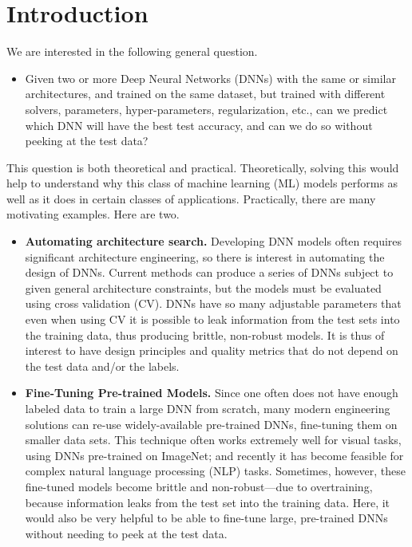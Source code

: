 
\section{Introduction}
\label{sxn:intro}

We are interested in the following general question.
\begin{itemize}
\item
Given two or more Deep Neural Networks (DNNs) with the same or similar architectures, and trained on the same dataset, but trained with different solvers, parameters, hyper-parameters, regularization, etc., can we predict which DNN will have the best test accuracy, and can we do so without peeking at the test data? 
\end{itemize}

This question is both theoretical and practical. 
Theoretically, solving this would help to understand why this class of machine learning (ML) models performs as well as it does in certain classes of applications.
Practically, there are many motivating examples.
% 
Here are two.
\begin{itemize}
\item
\textbf{Automating architecture search.}
Developing DNN models often requires significant architecture engineering, so there is interest in automating the design of DNNs.
Current methods can produce a series of DNNs subject to given general architecture constraints, but the models must be evaluated using cross validation (CV).
DNNs have so many adjustable parameters that even when using CV it is possible to leak information from the test sets into the training data, thus producing brittle, non-robust models.
It is thus of interest to have design principles and quality metrics that do not depend on the test data and/or the labels. 
\item
\textbf{Fine-Tuning Pre-trained Models.}
Since one often does not have enough labeled data to train a large DNN from scratch, many modern engineering solutions can re-use widely-available pre-trained DNNs, fine-tuning them on smaller data sets. 
This technique often works extremely well for visual tasks, using DNNs pre-trained on ImageNet; and recently it has become feasible for complex natural language processing (NLP) tasks. 
Sometimes, however, these fine-tuned models become brittle and non-robust---due to overtraining, because information leaks from the test set into the training data.
Here, it would also be very helpful to be able to fine-tune large, pre-trained DNNs without needing to peek at the test data.
\end{itemize}

